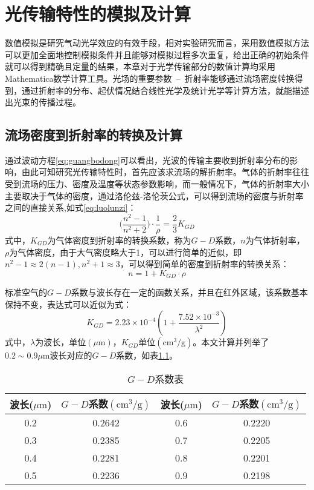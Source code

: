 \chapter{光传输特性的模拟及计算}
数值模拟是研究气动光学效应的有效手段，相对实验研究而言，采用数值模拟方法可以更加全面地控制模拟条件并且能够对模拟过程多次重复，给出正确的初始条件就可以得到精确且定量的结果，本章对于光学传输部分的数值计算均采用Mathematica数学计算工具。光场的重要参数~--~折射率能够通过流场密度转换得到，通过折射率的分布、起伏情况结合线性光学及统计光学等计算方法，就能描述出光束的传播过程。
\section{流场密度到折射率的转换及计算}
通过波动方程\eqref{eq:guangbodong}可以看出，光波的传输主要收到折射率分布的影响，由此可知研究光传输特性时，首先应该求流场的解折射率。气体的折射率往往受到流场的压力、密度及温度等状态参数影响，而一般情况下，气体的折射率大小主要取决于气体的密度，通过洛伦兹-洛伦茨公式，可以得到流场的密度与折射率之间的直接关系\cite{max2001},如式\eqref{eq:luolunzi}：
\begin{equation}
\Big(\frac{n^2-1}{n^2+2}\Big)\cdot\frac{1}{\rho}=\frac{2}{3}K_{GD}
\label{eq:luolunzi}
\end{equation}
式中，$K_{GD}$为气体密度到折射率的转换系数，称为$G-D$系数，$n$为气体折射率， $\rho$为气体密度，由于大气密度略大于1，可以进行简单的近似，即$n^2-1\approx2(n-1),n^2+1\approx3$，可以得到简单的密度到折射率的转换关系\cite{yxl2003qdgxyl}：
\begin{equation}
n=1+K_{GD}\cdot\rho
\label{eq:gdgongshi}
\end{equation}

标准空气的$G-D$系数与波长存在一定的函数关系，并且在红外区域，该系数基本保持不变，表达式可以近似为式：
\begin{equation}
K_{GD}=2.23\times 10^{-4}(1+\frac{7.52\times 10^{-3}}{\lambda^2})
\end{equation}
式中，$\lambda$为波长，单位$(\mu\text{m})$，$K_{GD}$单位$(\text{cm}^3/\text{g})$。本文计算并列举了$0.2\sim0.9\mu\text{m}$波长对应的$G-D$系数，如表\ref{tab:gdxishu}。
\begin{table}[bthp]
\caption{$G-D$系数表}
\label{tab:gdxishu}
\centering
\begin{tabular}{|c|c|c|c|}
\hline
波长($\mu \text{m}$)&$G-D$系数$(\text{cm}^3/\text{g})$&波长($\mu \text{m}$)&$G-D$系数$(\text{cm}^3/\text{g})$\\
\hline
0.2&0.2642&0.6&0.2220\\\hline
0.3&0.2385&0.7&0.2205\\\hline
0.4&0.2281&0.8&0.2201\\\hline
0.5&0.2236&0.9&0.2198\\\hline
\end{tabular}
\end{table}

